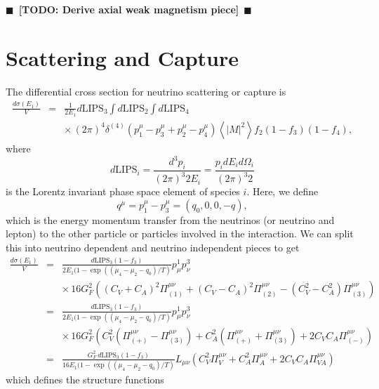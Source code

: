 \documentclass[12pt,letter]{article}
\newcommand{\todo}[1]{{$\blacksquare$~\textbf{\color{blue}[TODO: #1]}}~$\blacksquare$}
\begin{document}
\todo{Derive axial weak magnetism piece}

\section{Scattering and Capture} 
The differential cross section for neutrino scattering or capture is 
\begin{eqnarray*}
\frac{d \sigma(E_1)}{V} &=& \frac{1}{2 E_1} d\textrm{LIPS}_3 \int d\textrm{LIPS}_2 
\int d\textrm{LIPS}_4 \\
&& \times \, (2 \pi)^4 \delta^{(4)}\left(p^\mu_1 - p^\mu_3 + p^\mu_2 - p^\mu_4 \right)
\left\langle \left| M \right|^2 \right \rangle f_2 (1-f_3) (1-f_4),
\end{eqnarray*}
where 
\begin{equation*}
d\textrm{LIPS}_i = \frac{d^3p_i}{(2\pi)^3 2 E_i} 
= \frac{p_i dE_i d \Omega_i}{(2\pi)^3 2} 
\end{equation*}
is the Lorentz invariant phase space element of species $i$.  Here, we define 
\begin{equation}
q^\mu = p_1^\mu - p_3^\mu=(q_0,0,0,-q),
\end{equation}
which is the energy momentum transfer from the neutrinos (or neutrino and lepton) to the other particle or particles involved in the interaction.  We can split this into neutrino dependent and neutrino independent pieces to get 
\begin{eqnarray*}
\frac{d \sigma(E_1)}{V} &=& \frac{d\textrm{LIPS}_3 (1-f_3) }{2 E_1(1- \exp((\mu_4 - \mu_2 - q_0)/T)}  
p^1_\mu p^3_\nu \\
&&\times \, 16 G_F^2\left( 
 (C_V+C_A)^2 \Pi_{(1)}^{\mu \nu}
+(C_V-C_A)^2 \Pi_{(2)}^{\mu \nu}
-(C_V^2-C_A^2) \Pi_{(3)}^{\mu \nu} \right) \\
&=& \frac{d\textrm{LIPS}_3 (1-f_3)}{2 E_1(1- \exp((\mu_4 - \mu_2 - q_0)/T)}   
p^1_\mu p^3_\nu \\
&&\times \, 16 G_F^2\left( 
  C_V^2 \left(\Pi_{(+)}^{\mu \nu} - \Pi_{(3)}^{\mu \nu} \right) 
+ C_A^2 \left(\Pi_{(+)}^{\mu \nu} + \Pi_{(3)}^{\mu \nu} \right) 
+ 2 C_V C_A \Pi_{(-)}^{\mu \nu}
 \right) \\
&=& \frac{G_F^2 \, d\textrm{LIPS}_3 (1-f_3)}
{16 E_1(1 - \exp((\mu_4 - \mu_2 - q_0)/T)} 
 L_{\mu \nu} 
\left( 
  C_V^2 \Pi_V^{\mu \nu} 
+ C_A^2 \Pi_A^{\mu \nu}
+ 2 C_V C_A \Pi_{VA}^{\mu \nu}
 \right )
\end{eqnarray*}
which defines the structure functions 
\end{document}
